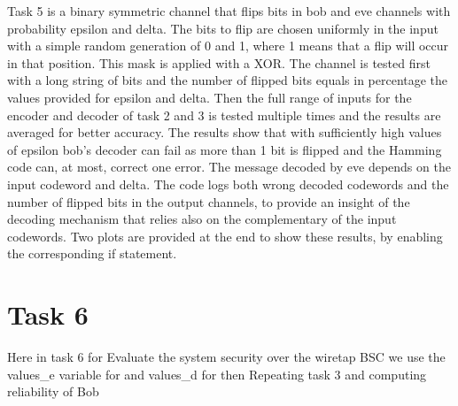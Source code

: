 \documentclass{report}
\begin{document}
Task 5 is a binary symmetric channel that flips bits in bob and eve channels with probability epsilon and delta. The bits to flip are chosen uniformly in the input with a simple random generation of 0 and 1, where 1 means that a flip will occur in that position. This mask is applied with a XOR.
The channel is tested first with a long string of bits and the number of flipped bits equals in percentage the values provided for epsilon and delta.
Then the full range of inputs for the encoder and decoder of task 2 and 3 is tested multiple times and the results are averaged for better accuracy.
The results show that with sufficiently high values of epsilon bob's decoder can fail as more than 1 bit is flipped and the Hamming code can, at most, correct one error. The message decoded by eve depends on the input codeword and delta.
The code logs both wrong decoded codewords and the number of flipped bits in the output channels, to provide an insight of the decoding mechanism that relies also on the complementary of the input codewords.
Two plots are provided at the end to show these results, by enabling the corresponding if statement.

\section*{Task 6}

Here in task 6 for Evaluate the system security over the wiretap BSC we use the values\_e variable for \textepsilon \space and values\_d for \textdelta \space then Repeating task 3 and computing reliability of Bob 
\end{document}
